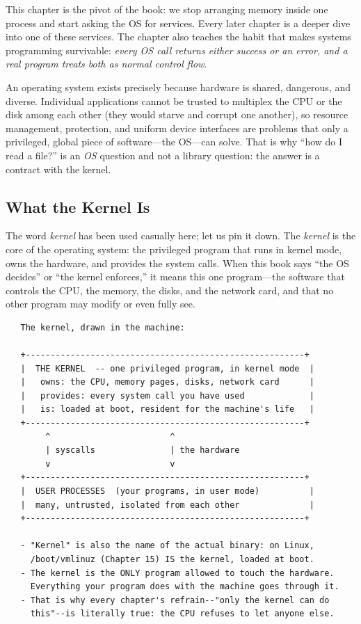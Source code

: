 This chapter is the pivot of the book: we stop arranging memory inside
one process and start asking the OS for services. Every later chapter
is a deeper dive into one of these services. The chapter also teaches
the habit that makes systems programming survivable: \emph{every
OS call returns either success or an error, and a real program treats
both as normal control flow}.

\begin{osconcept}
An operating system exists precisely because hardware is shared,
dangerous, and diverse. Individual applications cannot be trusted to
multiplex the CPU or the disk among each other (they would starve and
corrupt one another), so resource management, protection, and uniform
device interfaces are problems that only a privileged, global piece of
software---the OS---can solve. That is why ``how do I read a file?''
is an \emph{OS} question and not a library question: the answer is a
contract with the kernel.
\end{osconcept}

\subsection{What the Kernel Is}

The word \emph{kernel} has been used casually here; let us pin it
down. The \emph{kernel} is the core of the operating system: the
privileged program that runs in kernel mode, owns the hardware, and
provides the system calls. When this book says ``the OS decides'' or
``the kernel enforces,'' it means this one program---the software
that controls the CPU, the memory, the disks, and the network card,
and that no other program may modify or even fully see.

\begin{verbatim}
   The kernel, drawn in the machine:

   +--------------------------------------------------------+
   |  THE KERNEL  -- one privileged program, in kernel mode  |
   |   owns: the CPU, memory pages, disks, network card      |
   |   provides: every system call you have used             |
   |   is: loaded at boot, resident for the machine's life   |
   +--------------------------------------------------------+
        ^                        ^
        | syscalls               | the hardware
        v                        v
   +--------------------------------------------------------+
   |  USER PROCESSES  (your programs, in user mode)          |
   |  many, untrusted, isolated from each other              |
   +--------------------------------------------------------+

   - "Kernel" is also the name of the actual binary: on Linux,
     /boot/vmlinuz (Chapter 15) IS the kernel, loaded at boot.
   - The kernel is the ONLY program allowed to touch the hardware.
     Everything your program does with the machine goes through it.
   - That is why every chapter's refrain--"only the kernel can do
     this"--is literally true: the CPU refuses to let anyone else.
\end{verbatim}

